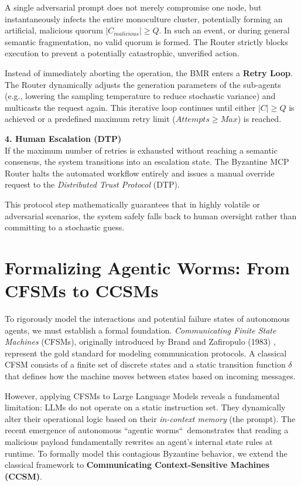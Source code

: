 \documentclass[a4paper,11pt,twocolumn]{article}
\theoremstyle{definition}
\theoremstyle{plain}
\begin{document}
A single adversarial prompt does not merely compromise one node, but instantaneously infects the entire monoculture cluster, potentially forming an artificial, malicious quorum $|C_{malicious}| \ge Q$.
In such an event, or during general semantic fragmentation, no valid quorum is formed.
The Router strictly blocks execution to prevent a potentially catastrophic, unverified action.

Instead of immediately aborting the operation, the BMR enters a \textbf{Retry Loop}. The Router dynamically adjusts the generation parameters of the sub-agents (e.g., lowering the sampling temperature to reduce stochastic variance) and multicasts the request again. This iterative loop continues until either $|C| \ge Q$ is achieved or a predefined maximum retry limit ($Attempts \ge Max$) is reached.

\textbf{4. Human Escalation (DTP)} \\
If the maximum number of retries is exhausted without reaching a semantic consensus, the system transitions into an escalation state. The Byzantine MCP Router halts the automated workflow entirely and issues a manual override request to the \textit{Distributed Trust Protocol} (DTP).

\pagebreak

This protocol step mathematically guarantees that in highly volatile or adversarial scenarios, the system safely falls back to human oversight rather than committing to a stochastic guess.

\section{Formalizing Agentic Worms: From CFSMs to CCSMs}

To rigorously model the interactions and potential failure states of autonomous agents, we must establish a formal foundation. \textit{Communicating Finite State Machines} (CFSMs), originally introduced by Brand and Zafiropulo (1983) \cite{brand1983communicating}, represent the gold standard for modeling communication protocols. A classical CFSM consists of a finite set of discrete states and a static transition function $\delta$ that defines how the machine moves between states based on incoming messages.

However, applying CFSMs to Large Language Models reveals a fundamental limitation: LLMs do not operate on a static instruction set. They dynamically alter their operational logic based on their \textit{in-context memory} (the prompt). The recent emergence of autonomous “agentic worms“\ demonstrates that reading a malicious payload fundamentally rewrites an agent's internal state rules at runtime. To formally model this contagious Byzantine behavior, we extend the classical framework to \textbf{Communicating Context-Sensitive Machines (CCSM)}.
\end{document}
